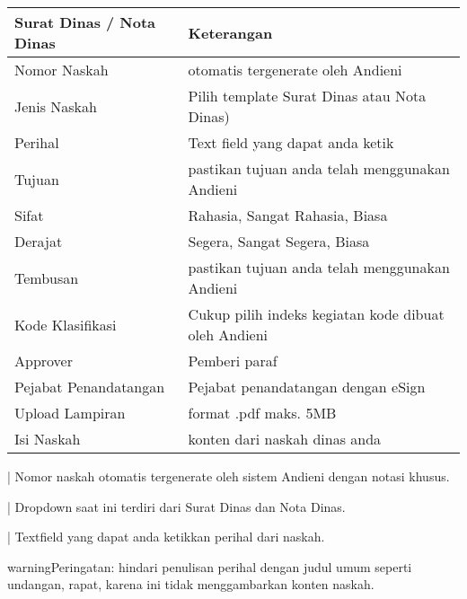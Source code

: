 \documentclass[letterpaper,10pt,bahasai]{sphinxmanual}
\begin{document}
\begin{savenotes}\sphinxattablestart
\centering
\begin{tabulary}{\linewidth}[t]{|T|T|}
\hline
\sphinxstyletheadfamily 
Surat Dinas / Nota Dinas
&\sphinxstyletheadfamily 
Keterangan
\\
\hline
Nomor Naskah
&
otomatis ter\sphinxhyphen{}generate oleh Andieni
\\
\hline
Jenis Naskah
&
Pilih template Surat Dinas atau
Nota Dinas)
\\
\hline
Perihal
&
Text field yang dapat anda ketik
\\
\hline
Tujuan
&
pastikan tujuan anda telah
menggunakan Andieni
\\
\hline
Sifat
&
Rahasia, Sangat Rahasia, Biasa
\\
\hline
Derajat
&
Segera, Sangat Segera, Biasa
\\
\hline
Tembusan
&
pastikan tujuan anda telah
menggunakan Andieni
\\
\hline
Kode Klasifikasi
&
Cukup pilih indeks kegiatan
kode dibuat oleh Andieni
\\
\hline
Approver
&
Pemberi paraf
\\
\hline
Pejabat Penandatangan
&
Pejabat penandatangan dengan eSign
\\
\hline
Upload Lampiran
&
format .pdf maks. 5MB
\\
\hline
Isi Naskah
&
konten dari naskah dinas anda
\\
\hline
\end{tabulary}
\par
\sphinxattableend\end{savenotes}

 | Nomor naskah otomatis ter\sphinxhyphen{}generate oleh sistem Andieni dengan notasi khusus.

\noindent{}

 | Dropdown saat ini terdiri dari Surat Dinas dan Nota Dinas.

\noindent{}

 | Textfield yang dapat anda ketikkan perihal dari naskah.

\noindent{}

\begin{sphinxadmonition}{warning}{Peringatan:}
hindari penulisan perihal dengan judul umum seperti undangan, rapat, karena ini tidak menggambarkan konten naskah.
\end{sphinxadmonition}
\end{document}

